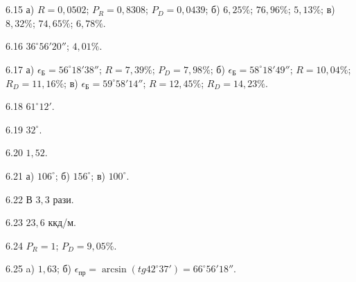 \protect \section *{}
\begin{Solution}{6.{15}}
      а) $ R = 0,0502 $; $ P_R = 0,8308 $; $ P_D = 0,0439 $; б) $ 6,25 \% $; $ 76,96 \% $; $ 5,13 \% $; в) $ 8,32 \% $; $ 74,65 \% $; $ 6,78 \% $.
    
\end{Solution}
\begin{Solution}{6.{16}}
        $ 36^\circ56'20'' $; $ 4,01 \% $.
    
\end{Solution}
\begin{Solution}{6.{17}}
        а) $ \epsilon_\text{Б} = 56^\circ 18' 38'' $; $ R = 7,39 \% $; $ P_D = 7,98 \% $; б) $ \epsilon_\text{Б} = 58^\circ 18' 49'' $; $ R =  10,04 \%$; $ R_D = 11,16 \% $; в) $ \epsilon_\text{Б} = 59^\circ 58' 14'' $; $ R =  12,45 \%$; $ R_D = 14,23 \% $.
    
\end{Solution}
\begin{Solution}{6.{18}}
        $ 61^\circ12' $.
    
\end{Solution}
\begin{Solution}{6.{19}}
        $ 32^\circ $.
    
\end{Solution}
\begin{Solution}{6.{20}}
        $ 1,52 $.
    
\end{Solution}
\begin{Solution}{6.{21}}
       а) $ 106^\circ $; б) $ 156^\circ $; в) $ 100^\circ $.
    
\end{Solution}
\begin{Solution}{6.{22}}
        В $ 3,3 $ рази.
    
\end{Solution}
\begin{Solution}{6.{23}}
        $ 23,6 $ ккд/м.
    
\end{Solution}
\begin{Solution}{6.{24}}
        $ P_R = 1$; $P_D = 9,05\% $.
    
\end{Solution}
\begin{Solution}{6.{25}}
        a) $ 1,63 $; б) $ \epsilon_\text{пр} = \arcsin(tg42^\circ37') = 66^\circ56'18'' $.
    
\end{Solution}
